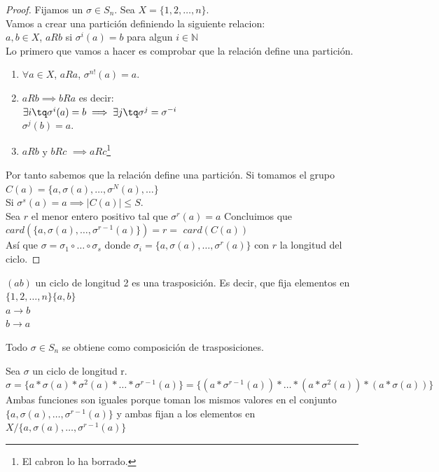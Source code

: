 \documentclass{apuntes}
\begin{document}
\begin{proof}
Fijamos un $\sigma \in S_n$. Sea $X = \{ 1,2,\hdots ,n\} $.\\
Vamos a crear una partición definiendo la siguiente relacion:\\
$a,b \in X$, $aRb$ si $\sigma ^i(a) = b$ para algun $i\in \mathbb{N}$\\

Lo primero que vamos a hacer es comprobar que la relación define una partición.\\
\begin{enumerate}
\item $\forall a \in X$, $aRa$, $\sigma ^{n!} (a) = a$.
\item $aRb \implies bRa$ es decir:\\
 $\exists i \tq \sigma ^i (a) = b \implies \exists j \tq \sigma ^j = \sigma ^{-i}$\\
 $\sigma ^j (b) = a$.
\item $aRb$ y $bRc$ $\implies aRc$\footnote{El cabron lo ha borrado.}
\end{enumerate}

Por tanto sabemos que la relación define una partición.
Si tomamos el grupo $C(a) = \{ a, \sigma (a), \hdots , \sigma ^N(a), \hdots \} $\\
Si $\sigma ^s (a)=a \implies |C(a)| \leq S$.\\
Sea $r$ el menor entero positivo tal que $\sigma ^r(a) = a$
Concluimos que $card(\{ a, \sigma (a), \hdots , \sigma ^{r-1}(a)\}) = r =$ $card(C(a))$\\
Así que $\sigma = \sigma _1 \circ \hdots \circ \sigma _s$
donde $\sigma _i = \{ a, \sigma (a), \hdots , \sigma ^r(a)\} $ con $r$ la longitud del ciclo.
\end{proof}

\begin{defn}[Trasposición]
$(ab)$ un ciclo de longitud 2 es una trasposición.
Es decir, que fija elementos en $\{ 1,2, \hdots , n\} \{ a, b\} $\\
$a\longrightarrow b$\\
$b\longrightarrow a$\\
\end{defn}

\begin{theorem}
Todo $\sigma \in S_n$ se obtiene como composición de trasposiciones.
\end{theorem}

\begin{example}
Sea $\sigma$ un ciclo de longitud r. \\
$\sigma = \{ a \ast \sigma (a)\ast \sigma ^2(a)\ast \hdots \ast \sigma ^{r-1}(a)\} =
\{(a\ast \sigma ^{r-1}(a))\ast \hdots \ast (a\ast \sigma ^2(a))\ast(a\ast \sigma (a)) \} $
\\Ambas funciones son iguales porque toman los mismos valores en el conjunto \\ $\{a, \sigma (a),\hdots , \sigma ^{r-1} (a) \}$ y ambas fijan a los elementos en $X / \{a, \sigma (a),\hdots , \sigma ^{r-1} (a) \}$ 
\end{example}
\end{document}
